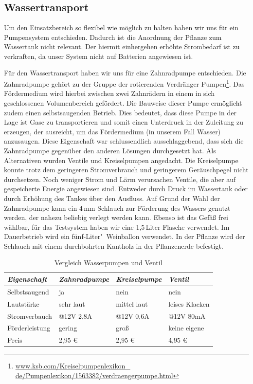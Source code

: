 \subsection{Wassertransport}
Um den Einsatzbereich so flexibel wie möglich zu halten haben wir uns für ein Pumpensystem entschieden. 
Dadurch ist die Anordnung der Pflanze zum Wassertank nicht relevant. 
Der hiermit einhergehen erhöhte Strombedarf ist zu verkraften, da unser System nicht auf Batterien angewiesen ist.

Für den Wassertransport haben wir uns für eine Zahnradpumpe entschieden.
Die Zahnradpumpe gehört zu der Gruppe der rotierenden Verdränger Pumpen\footnote{\href{http://www.ksb.com/Kreiselpumpenlexikon\_de/Pumpenlexikon/1563382/verdraengerpumpe.html}{www.ksb.com/Kreiselpumpenlexikon\_ \\ de/Pumpenlexikon/1563382/verdraengerpumpe.html}}.
Das Fördermedium wird hierbei zwischen zwei Zahnrädern in einem in sich geschlossenen Volumenbereich gefördert.
Die Bauweise dieser Pumpe ermöglicht zudem einen selbstsaugenden Betrieb. 
Dies bedeutet, dass diese Pumpe in der Lage ist Gase zu transportieren und somit einen Unterdruck in der Zuleitung zu erzeugen, der ausreicht, um das Fördermedium (in unserem Fall Wasser) anzusaugen. 
Diese Eigenschaft war schlussendlich ausschlaggebend, dass sich die Zahnradpumpe gegenüber den anderen Lösungen durchgesetzt hat.
Als Alternativen wurden Ventile und Kreiselpumpen angedacht.
Die Kreiselpumpe konnte trotz dem geringeren Stromverbrauch und geringerem Geräuschpegel nicht durchsetzen. 
Noch weniger Strom und Lärm verursachen Ventile, die aber auf gespeicherte Energie angewiesen sind.  
Entweder durch Druck im Wassertank oder durch Erhöhung des Tankes über den Ausfluss. 
Auf Grund der Wahl der Zahnradpumpe kann ein 4\,mm Schlauch zur Förderung des Wassers genutzt werden, der nahezu beliebig verlegt werden kann.  
Ebenso ist das Gefäß frei wählbar, für das Testsystem haben wir eine 1,5\,Liter Flasche verwendet. Im Dauerbetrieb wird ein fünf-Liter"~Weinballon verwendet. 
In der Pflanze wird der Schlauch mit einem durchbohrten Kantholz in der Pflanzenerde befestigt.

	
\begin{table}
	\centering
		\onehalfspacing
	\footnotesize
	\caption{Vergleich Wasserpumpen und Ventil}
	\label{Vergleich zwischen Wasserpumpen und Ventil}
		\begin{tabular}{|l|lll|}
		\hline
		\textit{Eigenschaft} & \textit{Zahnradpumpe} & \textit{Kreiselpumpe} & \textit{Ventil} \\
		\hline
		Selbstsaugend	&ja	&nein &nein\\		
		Lautstärke		&sehr laut	&mittel laut	&leises Klacken\\
		Stromverbauch	&@12V 2,8A	&@12V 0,6A	&@12V 80mA\\
		Förderleistung	&gering		&groß		&keine eigene\\
		Preis			&2,95 \euro	& 2,95 \euro	&	4,95 \euro\\
		\hline		
		\end{tabular}
		
\end{table}	
	
